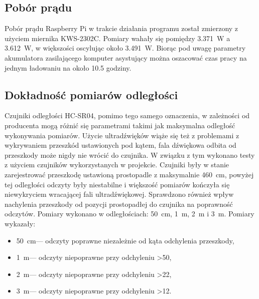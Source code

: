\documentclass[a4paper,12pt]{book}
\begin{document}
        \subsection{Pobór prądu}
        Pobór prądu Raspberry Pi w trakcie działania programu został zmierzony z użyciem miernika KWS-2302C. Pomiary wahały się pomiędzy 3.371~W a 3.612~W, w większości 
        oscylując około 3.491~W. Biorąc pod uwagę parametry akumulatora zasilającego komputer asystujący można oszacować czas pracy na jednym ładowaniu na około 10.5 godziny.
        \subsection{Dokładność pomiarów odległości}
        Czujniki odległości HC-SR04, pomimo tego samego oznaczenia, w zależności od producenta mogą różnić się parametrami takimi jak maksymalna odległość wykonywania pomiarów. 
        Użycie ultradźwięków wiąże się też z problemami z wykrywaniem przeszkód ustawionych pod kątem, fala dźwiękowa odbita od przeszkody może nigdy nie wrócić do 
        czujnika. W związku z tym wykonano testy z użyciem czujników wykorzystanych w projekcie. Czujniki były w stanie zarejestrować przeszkodę ustawioną prostopadle z 
        maksymalnie 460~cm, powyżej tej odległości odczyty były niestabilne i większość pomiarów kończyła się niewykryciem wracającej fali ultradźwiękowej. 
        Sprawdzono również wpływ nachylenia przeszkody od pozycji prostopadłej do czujnika na poprawność odczytów. Pomiary wykonano w odległościach: 50~cm, 
        1~m, 2~m i 3~m. Pomiary wykazały:
        \begin{itemize}
            \item 50~cm--- odczyty poprawne niezależnie od kąta odchylenia przeszkody,
            \item 1~m--- odczyty niepoprawne przy odchyleniu >50\textdegree,
            \item 2~m--- odczyty niepoprawne przy odchyleniu >22\textdegree,
            \item 3~m--- odczyty niepoprawne przy odchyleniu >12\textdegree.

\end{itemize}
\end{document}
